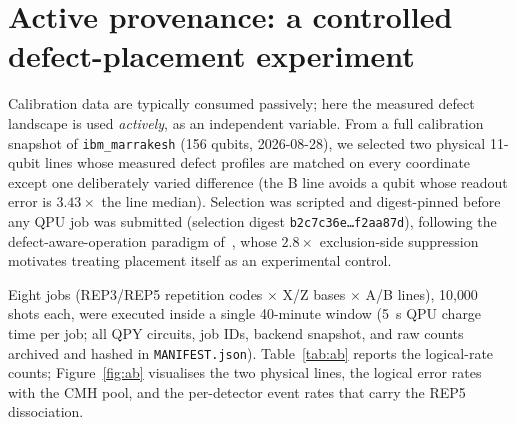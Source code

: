\documentclass[11pt,a4paper]{article}
\begin{document}

\appendix
\section{Active provenance: a controlled defect-placement experiment}
\label{app:activeprov}

Calibration data are typically consumed passively; here the measured defect
landscape is used \emph{actively}, as an independent variable. From a full
calibration snapshot of \texttt{ibm\_marrakesh} (156 qubits, 2026-08-28), we
selected two physical 11-qubit lines whose measured defect profiles are
matched on every coordinate except one deliberately varied difference (the
B line avoids a qubit whose readout error is $3.43\times$ the line median).
Selection was scripted and digest-pinned before any QPU job was submitted
(selection digest \texttt{b2c7c36e\ldots f2aa87d}), following the
defect-aware-operation paradigm of~\cite{Bartlett2026defect}, whose $2.8\times$
exclusion-side suppression motivates treating placement itself as an
experimental control.

Eight jobs (REP3/REP5 repetition codes $\times$ X/Z bases $\times$ A/B lines),
10{,}000 shots each, were executed inside a single 40-minute window
(5~s QPU charge time per job; all QPY circuits, job IDs, backend snapshot,
and raw counts archived and hashed in \texttt{MANIFEST.json}).
Table~\ref{tab:ab} reports the logical-rate counts;
Figure~\ref{fig:ab} visualises the two physical lines, the logical
error rates with the CMH pool, and the per-detector event rates that
carry the REP5 dissociation.
\end{document}
